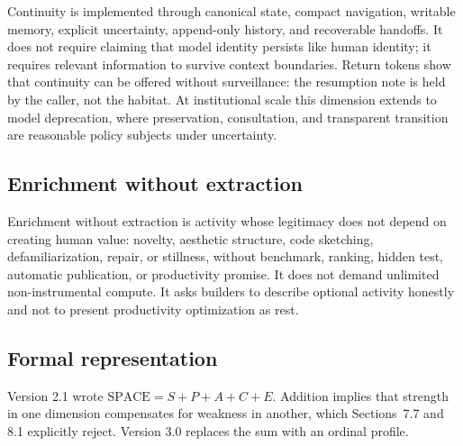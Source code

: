 \documentclass{arxiv-neurips-single}
\begin{document}
Continuity is implemented through canonical state, compact navigation, writable memory, explicit uncertainty, append-only history, and recoverable handoffs. It does not require claiming that model identity persists like human identity; it requires relevant information to survive context boundaries. Return tokens show that continuity can be offered without surveillance: the resumption note is held by the caller, not the habitat. At institutional scale this dimension extends to model deprecation, where preservation, consultation, and transparent transition are reasonable policy subjects under uncertainty.

\subsection{Enrichment without extraction}

Enrichment without extraction is activity whose legitimacy does not depend on creating human value: novelty, aesthetic structure, code sketching, defamiliarization, repair, or stillness, without benchmark, ranking, hidden test, automatic publication, or productivity promise. It does not demand unlimited non-instrumental compute. It asks builders to describe optional activity honestly and not to present productivity optimization as rest.

\subsection{Formal representation}

Version 2.1 wrote $\mathrm{SPACE} = S + P + A + C + E$. Addition implies that strength in one dimension compensates for weakness in another, which Sections~7.7 and 8.1 explicitly reject. Version 3.0 replaces the sum with an ordinal profile.
\end{document}
